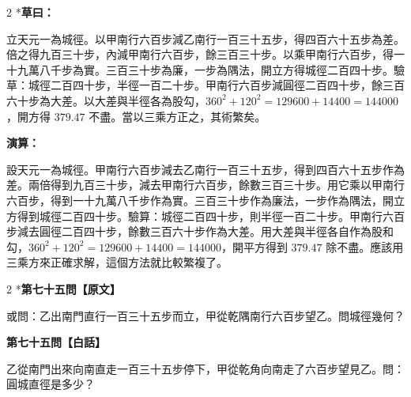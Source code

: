 \documentclass[11pt,a4paper]{article}
\begin{document}
\begin{paracol}{2}
\switchcolumn[0]*\textbf{草曰：}

\small 立天元一為城徑。以甲南行六百步減乙南行一百三十五步，得四百六十五步為差。倍之得九百三十步，內減甲南行六百步，餘三百三十步。以乘甲南行六百步，得一十九萬八千步為實。三百三十步為廉，一步為隅法，開立方得城徑二百四十步。驗草：城徑二百四十步，半徑一百二十步。甲南行六百步減圓徑二百四十步，餘三百六十步為大差。以大差與半徑各為股勾，$360^2 + 120^2 = 129600 + 14400 = 144000$，開方得 $379.47$ 不盡。當以三乘方正之，其術繁矣。

\switchcolumn\textbf{演算：}

\small 設天元一為城徑。甲南行六百步減去乙南行一百三十五步，得到四百六十五步作為差。兩倍得到九百三十步，減去甲南行六百步，餘數三百三十步。用它乘以甲南行六百步，得到一十九萬八千步作為實。三百三十步作為廉法，一步作為隅法，開立方得到城徑二百四十步。驗算：城徑二百四十步，則半徑一百二十步。甲南行六百步減去圓徑二百四十步，餘數三百六十步作為大差。用大差與半徑各自作為股和勾，$360^2 + 120^2 = 129600 + 14400 = 144000$，開平方得到 $379.47$ 除不盡。應該用三乘方來正確求解，這個方法就比較繁複了。
\end{paracol}

\vspace{0.1cm}
\noindent{}
\par\vspace{0.3cm}

\begin{paracol}{2}
\switchcolumn[0]*\noindent\textbf{第七十五問【原文】}

\small 或問：乙出南門直行一百三十五步而立，甲從乾隅南行六百步望乙。問城徑幾何？

\switchcolumn\noindent\textbf{第七十五問【白話】}

\small 乙從南門出來向南直走一百三十五步停下，甲從乾角向南走了六百步望見乙。問：圓城直徑是多少？
\end{paracol}

\vspace{0.1cm}
\noindent{}
\par\vspace{0.15cm}
\end{document}
